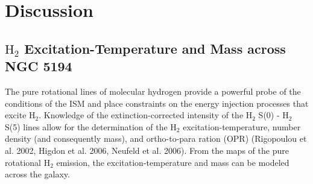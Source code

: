 \documentclass[manuscript]{aastex}
\begin{document}


\section{Discussion}

\subsection{$\mathrm{H_2}$ Excitation-Temperature and Mass across NGC 5194}

The pure rotational lines of molecular hydrogen provide a powerful probe of the conditions of the ISM and place constraints on the energy injection processes that excite $\mathrm{H_2}$.  Knowledge of the extinction-corrected intensity of the $\mathrm{H_2}$ S(0) - $\mathrm{H_2}$ S(5) lines allow for the determination of the $\mathrm{H_2}$ excitation-temperature, number density (and consequently mass), and ortho-to-para ration (OPR) (Rigopoulou et al. 2002, Higdon et al. 2006, Neufeld et al. 2006).  From the maps of the pure rotational $\mathrm{H_2}$ emission, the excitation-temperature and mass can be modeled across the galaxy.  
\end{document}

